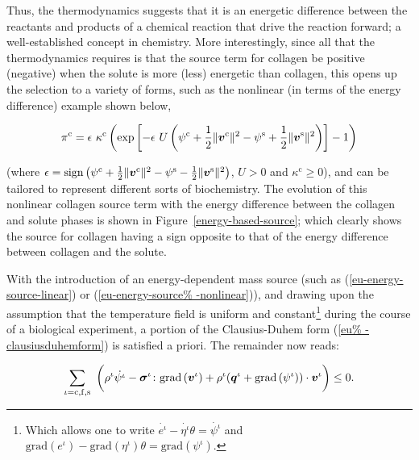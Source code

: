 Thus, the thermodynamics suggests that it is an energetic difference
between the reactants and products of a chemical reaction that drive
the reaction forward; a well-established concept in
chemistry. More interestingly, since all that the thermodynamics
requires is that the source term for collagen be positive (negative)
when the solute is more (less) energetic than collagen, this opens up
the selection to a variety of forms, such as the nonlinear (in terms
of the energy difference) example shown below,

\begin{equation}
\pi^{\mathrm{c}}=\epsilon\ \kappa^{\mathrm{c}}\left( \mathrm{exp}
\left[-\epsilon\ U \left(\psi^{\mathrm{c}}+\frac{1}{2}
  \Vert\bv^{\mathrm{c}}\Vert^2 - \psi^{\mathrm{s}}+\frac{1}{2}
  \Vert\bv^{\mathrm{s}}\Vert^2\right) \right] - 1\right)
\label{eu-energy-source-nonlinear}
\end{equation}

\noindent (where $\epsilon =
\mathrm{sign}\left(\psi^{\mathrm{c}}+\frac{1}{2}
\Vert\mbox{\boldmath$ v$}^{\mathrm{c}}\Vert^2 - \psi^{\mathrm{s}}-\frac{1}{2}
\Vert\mbox{\boldmath$ v$}^{\mathrm{s}}\Vert^2\right)$, $U>0$ and
$\kappa^{\mathrm{c}}\geq 0$), and can be tailored to represent
different sorts of biochemistry. The evolution of this nonlinear
collagen source term with the energy difference between the collagen
and solute phases is shown in Figure~\ref{energy-based-source}; which
clearly shows the source for collagen having a sign opposite to that
of the energy difference between collagen and the solute.

With the introduction of an energy-dependent mass source (such as
(\ref{eu-energy-source-linear}) or (\ref{eu-energy-source%
  -nonlinear})), and drawing upon the assumption that the temperature
field is uniform and constant\footnote{Which allows one to write
  $\dot{e^{\iota}} - \dot{\eta^{\iota}} \theta = \dot{\psi^{\iota}}$
  and $\mathrm{grad} \left(e^{\iota}\right) -
  \mathrm{grad}\left(\eta^{\iota} \right)\theta =
  \mathrm{grad}\left(\psi^{\iota} \right)$.} during the course of a
biological experiment, a portion of the Clausius-Duhem form (\ref{eu%
  -clausiusduhemform}) is satisfied a priori. The remainder now reads:

\begin{equation}
\sum\limits_{\iota=\mathrm{c},\mathrm{f},\mathrm{s}}\ \bigg(\rho^{\iota}
\dot{\psi^{\iota}}
-\Bsigma^{\iota}\colon\mathrm{grad}\left(\bv^{\iota}\right)+
\rho^{\iota} (\bq^{\iota}+\mathrm{grad}\left(\psi^{\iota}\right))
\cdot\bv^{\iota} \bigg) \leq 0.
\label{eu-reduced-dissipation-1}
\end{equation}

